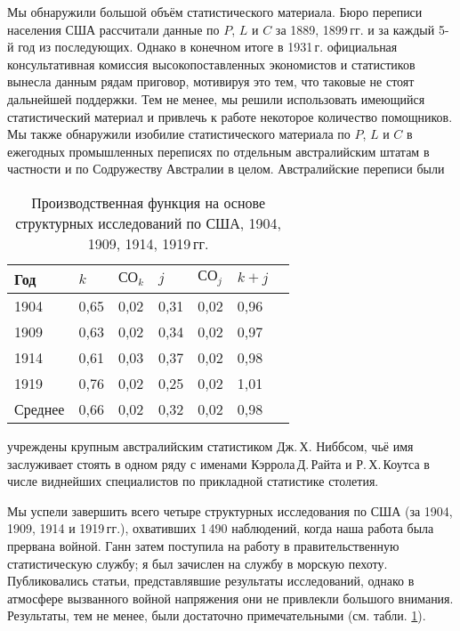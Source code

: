 \documentclass{article}
\begin{document}
Мы обнаружили большой объём статистического материала. Бюро переписи населения США рассчитали данные по \(P\), \(L\) и \(C\) за 1889, 1899\,гг. и за каждый 5-й год из последующих. Однако в конечном итоге в 1931\,г. официальная консультативная комиссия высокопоставленных экономистов и статистиков вынесла данным рядам приговор, мотивируя это тем, что таковые не стоят дальнейшей поддержки. Тем не менее, мы решили использовать имеющийся статистический материал и привлечь к работе некоторое количество помощников. Мы также обнаружили изобилие статистического материала по \(P\), \(L\) и \(C\) в ежегодных промышленных переписях по отдельным австралийским штатам в частности и по Содружеству Австралии в целом. Австралийские переписи были %
\begin{table}[!t]
\centering
\footnotesize{
\caption{Производственная функция на основе структурных исследований по США, 1904, 1909, 1914, 1919\,гг.}%
\label{tab1}%
\begin{tabular}{p{}
p{}
p{}
p{}
p{}
p{}
p{}}
\toprule
\toprule
\centering Год & \centering \(k\) & \centering \(\text{СО}_k\) & \centering \(j\) & \centering \(\text{СО}_j\) & \centering \(k + j\) & \\
\midrule
1904 & \hfil 0,65 & \hfil 0,02 & \hfil 0,31 & \hfil 0,02 & \hfil 0,96 & \\
1909 & \hfil 0,63 & \hfil 0,02 & \hfil 0,34 & \hfil 0,02 & \hfil 0,97 & \\
1914 & \hfil 0,61 & \hfil 0,03 & \hfil 0,37 & \hfil 0,02 & \hfil 0,98 & \\
1919 & \hfil 0,76 & \hfil 0,02 & \hfil 0,25 & \hfil 0,02 & \hfil 1,01 & \\
Среднее & \hfil 0,66 & \hfil 0,02 & \hfil 0,32 & \hfil 0,02 & \hfil 0,98 & \\
\bottomrule

\end{tabular}
}
\end{table}
учреждены крупным австралийским статистиком Дж.\,Х. Ниббсом, чьё имя заслуживает стоять в одном ряду с именами Кэррола\,Д.\,Райта и Р.\,Х.\,Коутса в числе виднейших специалистов по прикладной статистике столетия.

Мы успели завершить всего четыре структурных исследования по США (за 1904, 1909, 1914 и 1919\,гг.), охвативших 1\,490 наблюдений, когда наша работа была прервана войной. Ганн затем поступила на работу в правительственную статистическую службу; я был зачислен на службу в морскую пехоту. Публиковались статьи, представлявшие результаты исследований, однако в атмосфере вызванного войной напряжения они не привлекли большого внимания. Результаты, тем не менее, были достаточно примечательными (см. табли. \ref{tab1}).
\end{document}
